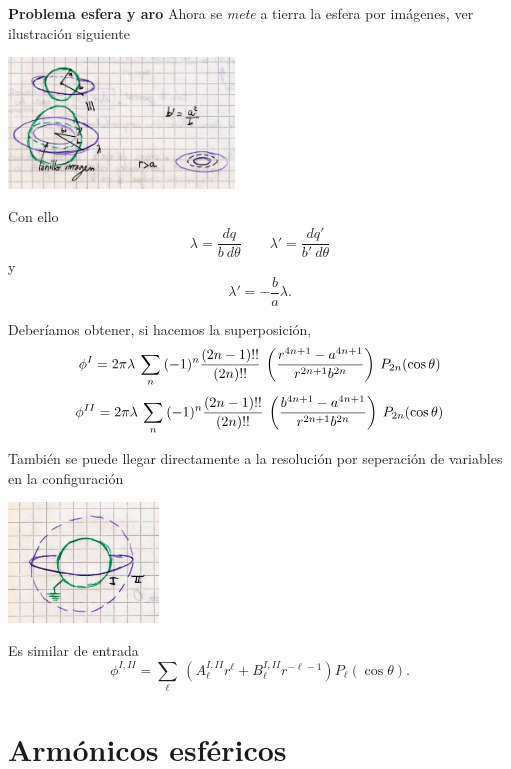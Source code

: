 \documentclass[10pt,oneside]{CBFT_book}
\begin{document}
\begin{ejemplo}{\bf Problema esfera y aro}
Ahora se {\it mete} a tierra la esfera por imágenes, ver ilustración siguiente

\includegraphics[width=0.45\textwidth]{images/fig_ft1_problema_esfera_anillada_C.jpg}

Con ello
\[
	\lambda = \frac{dq}{b \: d\theta} \qquad \lambda' = \frac{dq'}{b' \: d\theta}
\]
y
\[
	\lambda'= -\frac{b}{a}\lambda.
\]

Deberíamos obtener, si hacemos la superposición,
\[
	\phi^{I} = 2\pi\lambda \: \sum_n \: (-1)^n \frac{(2n-1)!!}{(2n)!!} 
	\: \left( \frac{  r^{4n+1} - a^{4n+1}  }{  r^{2n+1} b^{2n}  } \right) \: P_{2n}(\cos\theta) 
\]
\[
	\phi^{II} = 2\pi\lambda \: \sum_n \: (-1)^n \frac{(2n-1)!!}{(2n)!!} 
	\: \left( \frac{  b^{4n+1} - a^{4n+1}  }{ r^{2n+1} b^{2n}  } \right) \: P_{2n}(\cos\theta)
\]

También se puede llegar directamente a la resolución por seperación de variables en
la configuración

\includegraphics[width=0.3\textwidth]{images/fig_ft1_problema_esfera_anillada_D.jpg}

Es similar de entrada
\[
	\phi^{I,II} = \sum_\ell \: ( A_\ell^{I,II} r^\ell + B_\ell^{I,II} r^{-\ell-1}) P_\ell(\cos\theta).
\]


\end{ejemplo}



\section{Armónicos esféricos}
\end{document}
